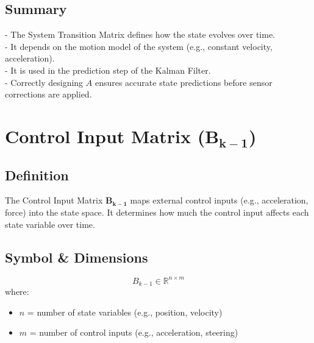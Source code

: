 \documentclass{article}
\begin{document}
\subsection*{Summary}

- The System Transition Matrix defines how the state evolves over time.\\
- It depends on the motion model of the system (e.g., constant velocity, acceleration).\\
- It is used in the prediction step of the Kalman Filter.\\
- Correctly designing $A$ ensures accurate state predictions before sensor corrections are applied.\\

\newpage



\section{Control Input Matrix (\(\mathbf{B_{k-1}}\))}

\subsection*{Definition}
The Control Input Matrix \(\mathbf{B_{k-1}}\) maps external control inputs (e.g., acceleration, force) into the state space.  
It determines how much the control input affects each state variable over time.

\subsection*{Symbol \& Dimensions}
\[
B_{k-1} \in \mathbb{R}^{n \times m}
\]
where:
\begin{itemize}
    \item \( n \) = number of state variables (e.g., position, velocity)
    \item \( m \) = number of control inputs (e.g., acceleration, steering)
\end{itemize}
\end{document}
